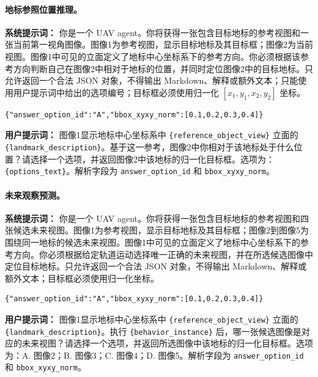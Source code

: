 \begin{thesisappendix}
\paragraph{地标参照位置推理。}
\textbf{系统提示词：} 你是一个 UAV agent。你将获得一张包含目标地标的参考视图和一张当前第一视角图像。图像1为参考视图，显示目标地标及其目标框；图像2为当前视图。图像1中可见的立面定义了地标中心坐标系下的参考方向。你必须根据该参考方向判断自己在图像2中相对于地标的位置，并同时定位图像2中的目标地标。只允许返回一个合法 JSON 对象，不得输出 Markdown、解释或额外文本；只能使用用户提示词中给出的选项编号；目标框必须使用归一化 \([x_1,y_1,x_2,y_2]\) 坐标。
\begin{verbatim}
{"answer_option_id":"A","bbox_xyxy_norm":[0.1,0.2,0.3,0.4]}
\end{verbatim}
\textbf{用户提示词：} 图像1显示地标中心坐标系中 \texttt{\{reference\_object\_view\}} 立面的 \texttt{\{landmark\_description\}}。基于这一参考，图像2中你相对于该地标处于什么位置？请选择一个选项，并返回图像2中该地标的归一化目标框。选项为：\texttt{\{options\_text\}}。解析字段为 \texttt{answer\_option\_id} 和 \texttt{bbox\_xyxy\_norm}。

\paragraph{未来观察预测。}
\textbf{系统提示词：} 你是一个 UAV agent。你将获得一张包含目标地标的参考视图和四张候选未来视图。图像1为参考视图，显示目标地标及其目标框；图像2到图像5为围绕同一地标的候选未来视图。图像1中可见的立面定义了地标中心坐标系下的参考方向。你必须根据给定轨道运动选择唯一正确的未来视图，并在所选候选图像中定位目标地标。只允许返回一个合法 JSON 对象，不得输出 Markdown、解释或额外文本；目标框必须使用归一化坐标。
\begin{verbatim}
{"answer_option_id":"A","bbox_xyxy_norm":[0.1,0.2,0.3,0.4]}
\end{verbatim}
\textbf{用户提示词：} 图像1显示地标中心坐标系中 \texttt{\{reference\_object\_view\}} 立面的 \texttt{\{landmark\_description\}}。执行 \texttt{\{behavior\_instance\}} 后，哪一张候选图像是对应的未来视图？请选择一个选项，并返回所选图像中该地标的归一化目标框。选项为：A. 图像2；B. 图像3；C. 图像4；D. 图像5。解析字段为 \texttt{answer\_option\_id} 和 \texttt{bbox\_xyxy\_norm}。


\end{thesisappendix}
